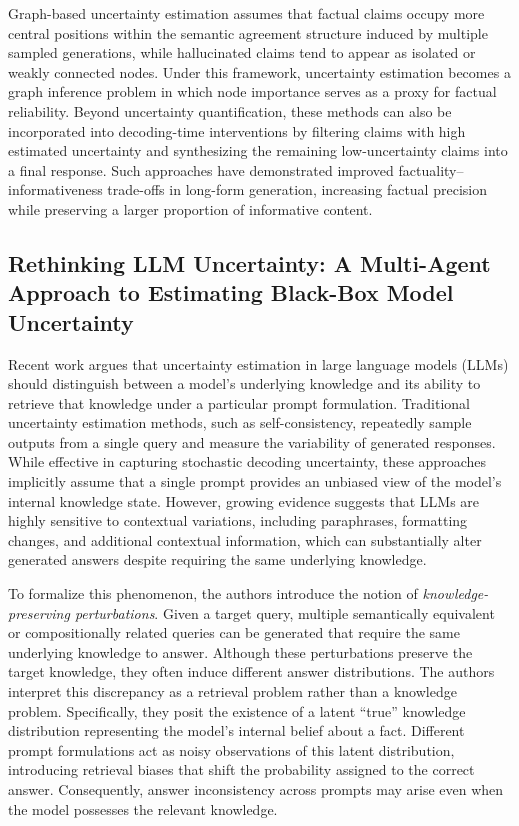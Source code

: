 Graph-based uncertainty estimation assumes that factual claims occupy more central positions within the semantic agreement structure induced by multiple sampled generations, while hallucinated claims tend to appear as isolated or weakly connected nodes. Under this framework, uncertainty estimation becomes a graph inference problem in which node importance serves as a proxy for factual reliability. Beyond uncertainty quantification, these methods can also be incorporated into decoding-time interventions by filtering claims with high estimated uncertainty and synthesizing the remaining low-uncertainty claims into a final response. Such approaches have demonstrated improved factuality–informativeness trade-offs in long-form generation, increasing factual precision while preserving a larger proportion of informative content.

\subsection{Rethinking LLM Uncertainty: A Multi-Agent Approach to Estimating Black-Box Model Uncertainty}

Recent work argues that uncertainty estimation in large language models (LLMs) should distinguish between a model's underlying knowledge and its ability to retrieve that knowledge under a particular prompt formulation. Traditional uncertainty estimation methods, such as self-consistency, repeatedly sample outputs from a single query and measure the variability of generated responses. While effective in capturing stochastic decoding uncertainty, these approaches implicitly assume that a single prompt provides an unbiased view of the model's internal knowledge state. However, growing evidence suggests that LLMs are highly sensitive to contextual variations, including paraphrases, formatting changes, and additional contextual information, which can substantially alter generated answers despite requiring the same underlying knowledge.

To formalize this phenomenon, the authors introduce the notion of \emph{knowledge-preserving perturbations}. Given a target query, multiple semantically equivalent or compositionally related queries can be generated that require the same underlying knowledge to answer. Although these perturbations preserve the target knowledge, they often induce different answer distributions. The authors interpret this discrepancy as a retrieval problem rather than a knowledge problem. Specifically, they posit the existence of a latent ``true'' knowledge distribution representing the model's internal belief about a fact. Different prompt formulations act as noisy observations of this latent distribution, introducing retrieval biases that shift the probability assigned to the correct answer. Consequently, answer inconsistency across prompts may arise even when the model possesses the relevant knowledge.

